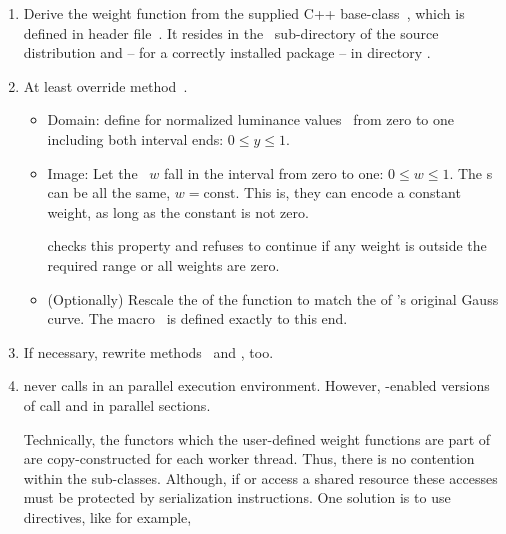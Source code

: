 \begin{enumerate}
\item
  \begin{sloppypar}
    Derive the weight function from the supplied C++ base-class~, which is
    defined in header file~.  It resides in the
    ~sub-directory of the source distribution and -- for a correctly installed
    package -- in directory .
  \end{sloppypar}

\item
  At least override method~.

  \begin{itemize}
  \item
    Domain: define  for normalized luminance values~ from zero to one
    including both interval ends: $0 \le y \le 1$.

  \item
    Image: Let the ~$w$ fall in the interval from zero to one: $0 \le w \le 1$.
    The s can be all the same, $w = \mbox{const}$.  This is, they can encode a
    constant weight, as long as the constant is not zero.

    \App{} checks this property and refuses to continue if any weight is outside the required
    range or all weights are zero.

  \item
    (Optionally) Rescale the  of the function to match the  of
    \App{}'s original Gauss curve.  The macro~ is defined exactly to this
    end.
  \end{itemize}

\item
  If necessary, rewrite methods~ and , too.

\item

  \App{} never calls  in an  parallel execution environment.
  However, -enabled versions of \App{} call  and 
  in parallel sections.

  Technically, the functors which the user-defined weight functions are part of are
  copy-constructed for each  worker thread.  Thus, there is no contention within
  the  sub-classes.  Although, if  or  access
  a shared resource these accesses must be protected by serialization instructions.  One
  solution is to use  directives, like for example,


\end{enumerate}
